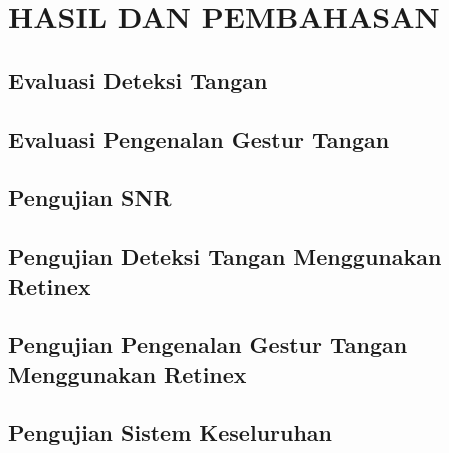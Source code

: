 \chapter{HASIL DAN PEMBAHASAN}
\section{Evaluasi Deteksi Tangan}
\section{Evaluasi Pengenalan Gestur Tangan}
\section{Pengujian SNR}
\section{Pengujian Deteksi Tangan Menggunakan Retinex}
\section{Pengujian Pengenalan Gestur Tangan Menggunakan Retinex}
\section{Pengujian Sistem Keseluruhan}